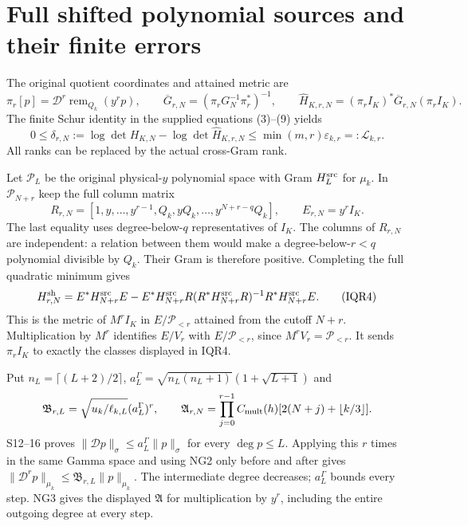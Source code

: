 \documentclass[11pt]{article}
\begin{document}
\section{Full shifted polynomial sources and their finite errors}
The original quotient coordinates and attained metric are
\[
\pi_r[p]=\mathscr D^r\operatorname{rem}_{Q_k}(y^rp),\qquad
\overline G_{r,N}=(\pi_rG_N^{-1}\pi_r^*)^{-1},\qquad
\widehat H_{K,r,N}=(\pi_rI_K)^*\overline G_{r,N}(\pi_rI_K).
\]
The finite Schur identity in the supplied equations (3)--(9) yields
\[
0\le\delta_{r,N}:=\log\det H_{K,N}-\log\det\widehat H_{K,r,N}
\le\min(m,r)\varepsilon_{k,r}=:\mathcal L_{k,r}.
\tag{IQR3}
\]
All ranks can be replaced by the actual cross-Gram rank.

Let $\mathcal P_L$ be the original physical-$y$ polynomial space with
Gram $H_L^{\rm src}$ for $\mu_k$. In $\mathcal P_{N+r}$ keep the full
column matrix
\[
R_{r,N}=[1,y,\ldots,y^{r-1},Q_k,yQ_k,\ldots,y^{N+r-q}Q_k],
\qquad E_{r,N}=y^rI_K .
\]
The last equality uses degree-below-$q$ representatives of $I_K$.
The columns of $R_{r,N}$ are independent: a relation between them
would make a degree-below-$r<q$ polynomial divisible by $Q_k$.
Their Gram is therefore positive. Completing the full quadratic
minimum gives
\[
H^{\rm sh}_{r,N}=E^*H^{\rm src}_{N+r}E
-E^*H^{\rm src}_{N+r}R(R^*H^{\rm src}_{N+r}R)^{-1}
 R^*H^{\rm src}_{N+r}E .
\tag{IQR4}
\]
This is the metric of $M^rI_K$ in $E/\mathcal P_{<r}$ attained from
the cutoff $N+r$. Multiplication by $M^r$ identifies $E/V_r$
with $E/\mathcal P_{<r}$, since $M^rV_r=\mathcal P_{<r}$.
It sends $\pi_r I_K$ to exactly the classes displayed in IQR4.

Put $n_L=\lceil(L+2)/2\rceil$,
$a_L^\Gamma=\sqrt{n_L(n_L+1)}(1+\sqrt{L+1})$ and
\[
\mathfrak B_{r,L}=\sqrt{u_k/\ell_{k,L}}(a_L^\Gamma)^r,\qquad
\mathfrak A_{r,N}=\prod_{j=0}^{r-1}
 C_{\rm mult}(h)[2(N+j)+\lfloor k/3\rfloor].
\]
S12--16 \cite{Smallest} proves $\|\mathscr D p\|_\sigma\le
a_L^\Gamma\|p\|_\sigma$ for every $\deg p\le L$.
Applying this $r$ times in the same Gamma space and using NG2
only before and after gives
$\|\mathscr D^rp\|_{\mu_k}\le\mathfrak B_{r,L}\|p\|_{\mu_k}$.
The intermediate degree decreases; $a_L^\Gamma$ bounds every step.
NG3 \cite{NG} gives the displayed $\mathfrak A$ for multiplication
by $y^r$, including the entire outgoing degree at every step.
\end{document}

